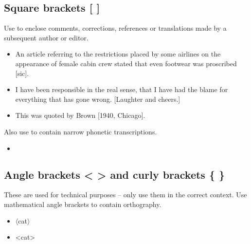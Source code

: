 \documentclass[11pt,a4paper]{book}
\newcommand{\xmark}{{\color{cadmiumred}\ding{54}}}%
\newcommand{\cmark}{{\color{green(html/cssgreen)}\checkmark}}%
\begin{document}
			\subsection{Square brackets [ ]}
			Use to enclose comments, corrections, references or translations made by a subsequent author or editor.
			{\firasans \begin{mdframed}[backgroundcolor=aliceblue] \begin{itemize}[label=\cmark]
				\item An article referring to the restrictions placed by some airlines on the appearance of female cabin crew stated that even footwear was proscribed [sic].
				\item I have been responsible in the real sense, that I have had the blame for everything that has gone wrong. [Laughter and cheers.]
				\item This was quoted by Brown [1940, Chicago].
			\end{itemize} \end{mdframed} }
			Also use to contain narrow phonetic transcriptions.
			{\firasans \begin{mdframed}[backgroundcolor=aliceblue] \begin{itemize}[label=\cmark]
				\item[\cmark] {\andika [kʰæʔ]}
			\end{itemize} \end{mdframed} }
			\subsection{Angle brackets < > and curly brackets \{ \}}
			These are used for technical purposes -- only use them in the correct context. 
			Use mathematical angle brackets to contain orthography.
			{\firasans \begin{mdframed}[backgroundcolor=aliceblue] \begin{itemize}[label=\cmark]
				\item[\cmark] {\andika [kʰæʔ]} $\langle$cat$\rangle$
				\item[\xmark] {\andika [kʰæʔ]} <cat>
			\end{itemize} \end{mdframed} }
\end{document}
